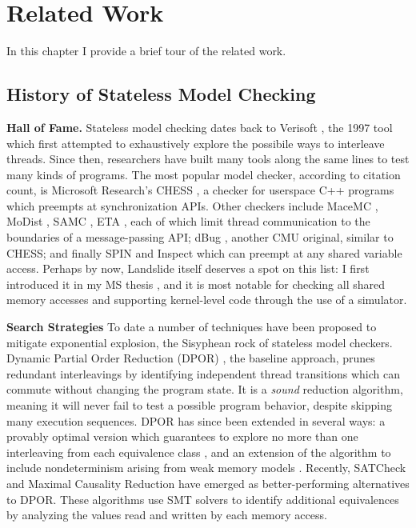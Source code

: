 \chapter{Related Work}
\label{chap:related}

In this chapter I provide a brief tour of the related work.

\section{History of Stateless Model Checking}

{\bf Hall of Fame.}
Stateless model checking dates back to Verisoft \cite{verisoft}, the 1997 tool which first attempted to exhaustively explore the possibile ways to interleave threads.
Since then, researchers have built many tools along the same lines to test many kinds of programs.
The most popular model checker, according to citation count, is Microsoft Research's CHESS \cite{chess},
a checker for userspace C++ programs which preempts at synchronization APIs.
%
Other checkers include MaceMC \cite{macemc}, MoDist \cite{modist}, SAMC \cite{samc}, ETA \cite{dbug-retreat},
each of which limit thread communication to the boundaries of a message-passing API;
%
dBug \cite{dbug-ssv}, another CMU original, similar to CHESS;
%
and finally SPIN \cite{spin} and Inspect \cite{inspect} which can preempt at any shared variable access.
%
Perhaps by now, Landslide itself deserves a spot on this list: I first introduced it in my MS thesis \cite{landslide},
and it is most notable for checking all shared memory accesses and supporting kernel-level code through the use of a simulator.

{\bf Search Strategies}
To date a number of techniques have been proposed to mitigate exponential explosion, the Sisyphean rock of stateless model checkers.
Dynamic Partial Order Reduction (DPOR) \cite{dpor}, the baseline approach, prunes redundant interleavings by identifying independent thread transitions which can commute without changing the program state.
It is a {\em sound} reduction algorithm, meaning it will never fail to test a possible program behavior, despite skipping many execution sequences.
DPOR has since been extended in several ways:
a provably optimal version which guarantees to explore no more than one interleaving from each equivalence class \cite{optimal-dpor},
and an extension of the algorithm to include nondeterminism arising from weak memory models \cite{tsopso}.
Recently, SATCheck and Maximal Causality Reduction have emerged as better-performing alternatives to DPOR.
These algorithms use SMT solvers \cite{z3} to identify additional equivalences by analyzing the values read and written by each memory access.

